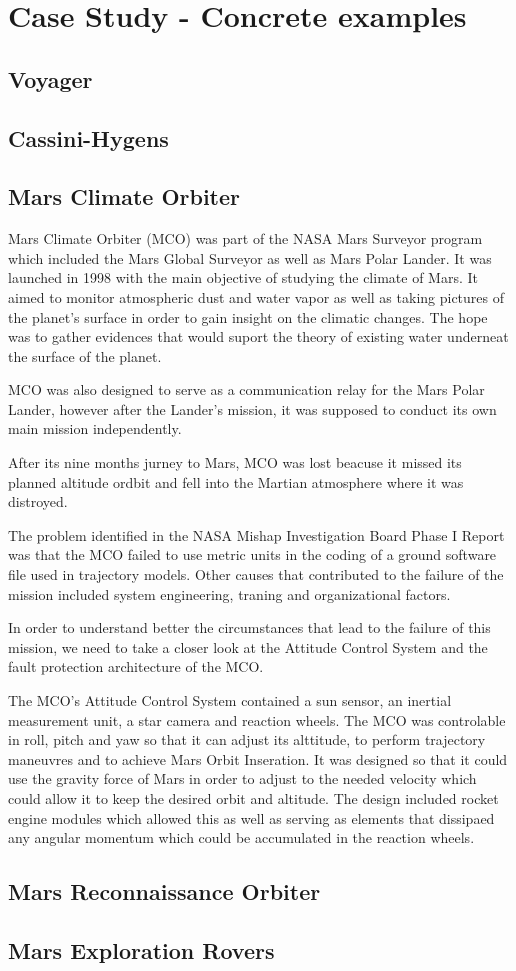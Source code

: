 \section{Case Study - Concrete examples}


\subsection{Voyager}
\subsection{Cassini-Hygens}
\subsection{Mars Climate Orbiter\cite{mco-nasa}}
Mars Climate Orbiter (MCO) was part of the NASA Mars Surveyor program which
included the Mars Global Surveyor as well as Mars Polar Lander. It was launched
in 1998 with the main objective of studying the climate of Mars. It aimed to
monitor atmospheric dust and water vapor as well as taking pictures of the
planet's surface in order to gain insight on the climatic changes. The hope was
to gather evidences that would suport the theory of existing water underneat the
surface of the planet.

MCO was also designed to serve as a communication relay for the Mars Polar
Lander, however after the Lander's mission, it was supposed to conduct its own
main mission independently.

After its nine months jurney to Mars, MCO was lost beacuse it missed its planned
altitude ordbit and fell into the Martian atmosphere where it was distroyed.

The problem identified in the NASA Mishap Investigation Board Phase I Report was
that the MCO failed to use metric units in the coding of a ground software file
used in trajectory models. Other causes that contributed to the failure of the
mission included system engineering, traning and organizational factors.

In order to understand better the circumstances that lead to the failure of this
mission, we need to take a closer look at the Attitude Control System and
the fault protection architecture of the MCO\cite{surv-nasa-mars}.

The MCO's Attitude Control System contained a sun sensor, an inertial
measurement unit, a star camera and reaction wheels. The MCO was controlable in
roll, pitch and yaw so that it can adjust its alttitude, to perform trajectory
maneuvres and to achieve Mars Orbit Inseration. It was designed so that it could
use the gravity force of Mars in order to adjust to the needed velocity which
could allow it to keep the desired orbit and altitude. The design included
rocket engine modules which allowed this as well as serving as elements that
dissipaed any angular momentum which could be accumulated in the reaction
wheels. 
\cite{mco-rep}
\subsection{Mars Reconnaissance Orbiter}
\subsection{Mars Exploration Rovers}